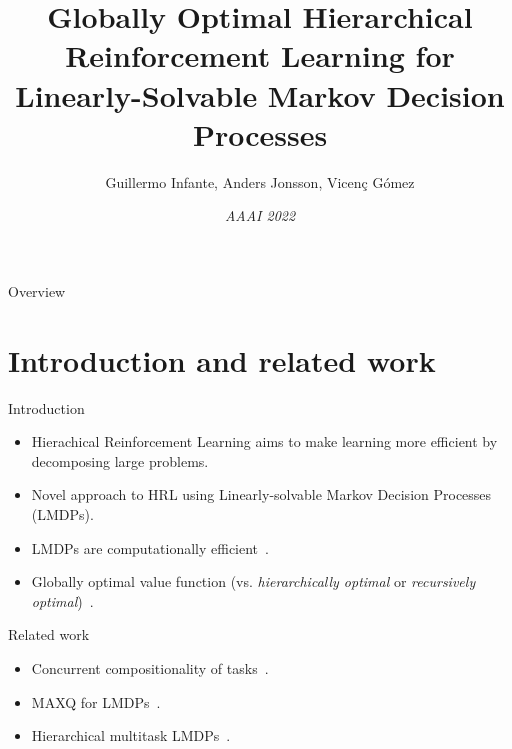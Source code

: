 \documentclass{beamer}
\title[Globally Optimal HRL for LMDPs]{Globally Optimal Hierarchical Reinforcement Learning for Linearly-Solvable Markov Decision Processes}
\author[G. Infante, A. Jonsson, V. Gómez ]{Guillermo Infante, Anders Jonsson, Vicenç Gómez}
\date[]{\textit{AAAI 2022}}
\theoremstyle{mystyle}
\begin{document}
\begin{frame}
   \maketitle
\end{frame}

\begin{frame}{Overview}
\tableofcontents
\end{frame}

\section{Introduction and related work}

\begin{frame}{Introduction}

\begin{itemize}
    \item Hierachical Reinforcement Learning aims to make {\color{blue} learning more efficient} by decomposing large problems. %
    \item Novel approach to HRL using Linearly-solvable Markov Decision Processes (LMDPs).
    \item LMDPs are {\color{blue} computationally efficient}~\citep{TodorovNIPS2007}.
    \item {\color{blue}Globally optimal value function} (vs. \textit{hierarchically optimal} or \textit{recursively optimal})~\citep{dietterich2000hierarchical}. 
\end{itemize}
    
\end{frame}

\begin{frame}{Related work}
   \begin{itemize}
       \item Concurrent compositionality of tasks~\citep*{van2019composing}.
       \item MAXQ for LMDPs~\citep*{conf/icaps/Jonsson16}.
       \item Hierarchical multitask LMDPs~\citep*{saxe2017hierarchy}.
   \end{itemize}
\end{frame}
\end{document}
